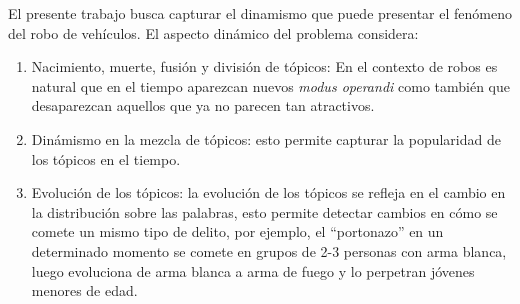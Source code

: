 \documentclass[letterpaper,12pt,oneside]{book} %
\begin{document}
El presente trabajo busca capturar el dinamismo que puede presentar el fenómeno del robo de vehículos. El aspecto dinámico del problema considera:
\begin{enumerate}
    \item Nacimiento, muerte, fusión y división de tópicos: En el contexto de robos es natural que en el tiempo aparezcan nuevos \textit{modus operandi} como también que desaparezcan aquellos que ya no parecen tan atractivos.
    \item Dinámismo en la mezcla de tópicos: esto permite capturar la popularidad de los tópicos en el tiempo.
    \item Evolución de los tópicos: la evolución de los tópicos se refleja en el cambio en la distribución sobre las palabras, esto permite detectar cambios en cómo se comete un mismo tipo de delito, por ejemplo, el ``portonazo'' en un determinado momento se comete en grupos de 2-3 personas con arma blanca, luego evoluciona de arma blanca a arma de fuego y lo perpetran jóvenes menores de edad.
\end{enumerate}
\end{document}
